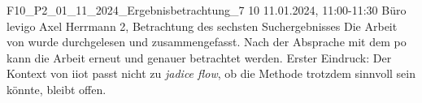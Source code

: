 \fieldnote
{F10\_P2\_01\_11\_2024\_Ergebnisbetrachtung\_7}
{10}
{11.01.2024, 11:00-11:30}
{Büro levigo}
{Axel Herrmann}
{2, Betrachtung des sechsten Suchergebnisses}
{
  Die Arbeit von  wurde durchgelesen und zusammengefasst.
}
{
  Nach der Absprache mit dem \gls{po} kann die Arbeit erneut und genauer betrachtet werden.
}
{
}
{}
{
  Erster Eindruck: Der Kontext von \gls{iiot} passt nicht zu \emph{jadice flow}, ob die Methode trotzdem sinnvoll sein könnte, bleibt offen.
}
